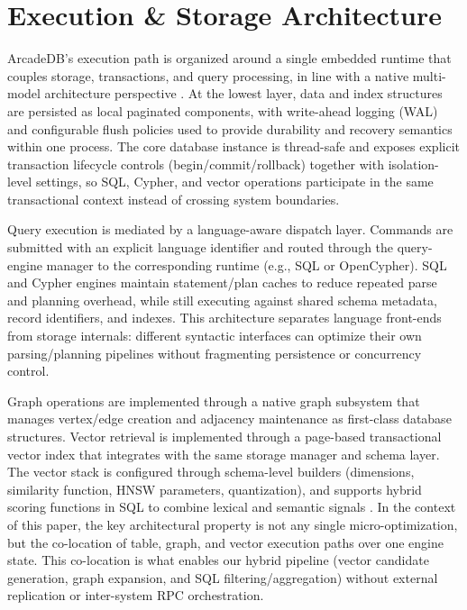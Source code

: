 \documentclass[sigconf, nonacm]{acmart}
\begin{document}
\section{Execution \& Storage Architecture}

ArcadeDB’s execution path is organized around a single embedded runtime that couples storage, transactions, and query processing, in line with a native multi-model architecture perspective \cite{Lu_2019,Guo_2023}. At the lowest layer, data and index structures are persisted as local paginated components, with write-ahead logging (WAL) and configurable flush policies used to provide durability and recovery semantics within one process. The core database instance is thread-safe and exposes explicit transaction lifecycle controls (begin/commit/rollback) together with isolation-level settings, so SQL, Cypher, and vector operations participate in the same transactional context instead of crossing system boundaries.

Query execution is mediated by a language-aware dispatch layer. Commands are submitted with an explicit language identifier and routed through the query-engine manager to the corresponding runtime (e.g., SQL or OpenCypher). SQL and Cypher engines maintain statement/plan caches to reduce repeated parse and planning overhead, while still executing against shared schema metadata, record identifiers, and indexes. This architecture separates language front-ends from storage internals: different syntactic interfaces can optimize their own parsing/planning pipelines without fragmenting persistence or concurrency control.

Graph operations are implemented through a native graph subsystem that manages vertex/edge creation and adjacency maintenance as first-class database structures. Vector retrieval is implemented through a page-based transactional vector index that integrates with the same storage manager and schema layer. The vector stack is configured through schema-level builders (dimensions, similarity function, HNSW parameters, quantization), and supports hybrid scoring functions in SQL to combine lexical and semantic signals \cite{malkov2016efficient,Pan_2024_vldbj,Chronis_2025}. In the context of this paper, the key architectural property is not any single micro-optimization, but the co-location of table, graph, and vector execution paths over one engine state. This co-location is what enables our hybrid pipeline (vector candidate generation, graph expansion, and SQL filtering/aggregation) without external replication or inter-system RPC orchestration.
\end{document}
